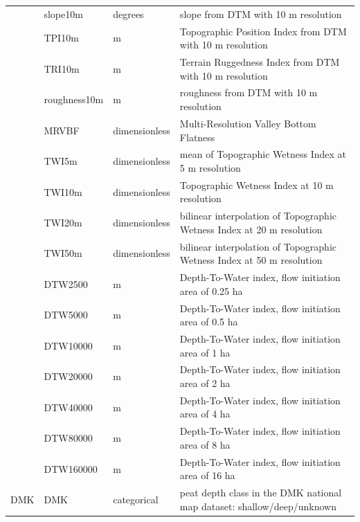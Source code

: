 \documentclass[soil, manuscript]{copernicus}
\begin{document}
\begin{table}[tbp]
\begin{tabular}{llll}
             & slope10m     & degrees               & slope from DTM with 10 m resolution                                    \\
             & TPI10m       & m                     & Topographic Position Index from DTM with 10 m resolution               \\
             & TRI10m       & m                     & Terrain Ruggedness Index from DTM with 10 m resolution                 \\
             & roughness10m & m                     & roughness from DTM with 10 m resolution                                \\
             & MRVBF        & dimensionless         & Multi-Resolution Valley Bottom Flatness                                \\
             & TWI5m        & dimensionless         & mean of Topographic Wetness Index at 5 m resolution                    \\
             & TWI10m       & dimensionless         & Topographic Wetness Index at 10 m resolution                           \\
             & TWI20m       & dimensionless         & bilinear interpolation of Topographic Wetness Index at 20 m resolution \\
             & TWI50m       & dimensionless         & bilinear interpolation of Topographic Wetness Index at 50 m resolution \\
             & DTW2500      & m                     & Depth-To-Water index, flow initiation area of 0.25 ha                  \\
             & DTW5000      & m                     & Depth-To-Water index, flow initiation area of 0.5 ha                   \\
             & DTW10000     & m                     & Depth-To-Water index, flow initiation area of 1 ha                     \\
             & DTW20000     & m                     & Depth-To-Water index, flow initiation area of 2 ha                     \\
             & DTW40000     & m                     & Depth-To-Water index, flow initiation area of 4 ha                     \\
             & DTW80000     & m                     & Depth-To-Water index, flow initiation area of 8 ha                     \\
             & DTW160000    & m                     & Depth-To-Water index, flow initiation area of 16 ha                    \\
DMK          & DMK          & categorical           & peat depth class in the DMK national map dataset: shallow/deep/unknown \\ \hline
\end{tabular}
\label{tab:preds}
\end{table}
\end{document}
